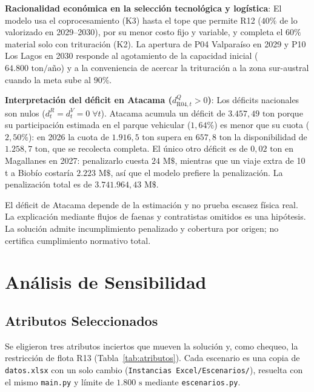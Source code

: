\documentclass[letterpaper]{article}
\begin{document}
\textbf{Racionalidad económica en la selección tecnológica y logística}: El modelo usa el coprocesamiento (K3) hasta el tope que permite R12 ($40\%$ de lo valorizado en 2029--2030), por su menor costo fijo y variable, y completa el $60\%$ material solo con trituración (K2). La apertura de P04 Valparaíso en 2029 y P10 Los Lagos en 2030 responde al agotamiento de la capacidad inicial ($64.800\text{ ton/año}$) y a la conveniencia de acercar la trituración a la zona sur-austral cuando la meta sube al $90\%$.

\textbf{Interpretación del déficit en Atacama ($d^{Q}_{\text{R04},t}>0$)}: Los déficits nacionales son nulos ($d^{R}_{t}=d^{V}_{t}=0\;\forall t$). Atacama acumula un déficit de $3.457,49\text{ ton}$ porque su participación estimada en el parque vehicular ($1,64\%$) es menor que su cuota ($2,50\%$): en 2026 la cuota de $1.916,5\text{ ton}$ supera en $657,8\text{ ton}$ la disponibilidad de $1.258,7\text{ ton}$, que se recolecta completa. El único otro déficit es de $0,02\text{ ton}$ en Magallanes en 2027: penalizarlo cuesta $24\text{ M\$}$, mientras que un viaje extra de 10 t a Biobío costaría $2.223\text{ M\$}$, así que el modelo prefiere la penalización. La penalización total es de $3.741.964,43\text{ M\$}$.

El déficit de Atacama depende de la estimación y no prueba escasez física real. La explicación mediante flujos de faenas y contratistas omitidos es una hipótesis. La solución admite incumplimiento penalizado y cobertura por origen; no certifica cumplimiento normativo total.


\section{Análisis de Sensibilidad}

\subsection{Atributos Seleccionados}

Se eligieron tres atributos inciertos que mueven la solución y, como chequeo, la restricción de flota R13 (Tabla~\ref{tab:atributos}). Cada escenario es una copia de \texttt{datos.xlsx} con un solo cambio (\texttt{Instancias Excel/Escenarios/}), resuelta con el mismo \texttt{main.py} y límite de $1.800\text{ s}$ mediante \texttt{escenarios.py}.
\end{document}
